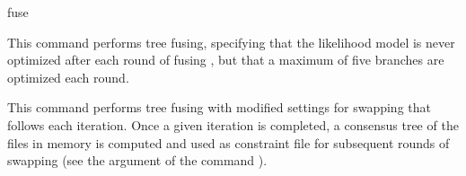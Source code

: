 \begin{command}{fuse}{}
\begin{poyexamples}
            {This command performs tree fusing, specifying that the likelihood model is never optimized 
            after each round of fusing , but that a maximum of five branches are optimized
            each round.}
            
            {This command performs tree fusing  with modified settings for swapping
            that follows each iteration. Once a given iteration is completed, a
            consensus tree of the files in memory is computed and used as constraint
            file for subsequent rounds of swapping (see the argument
             of the command ).}    

     \end{poyexamples}
        
    \begin{poyalso}
    \end{poyalso}

\end{command}



   
